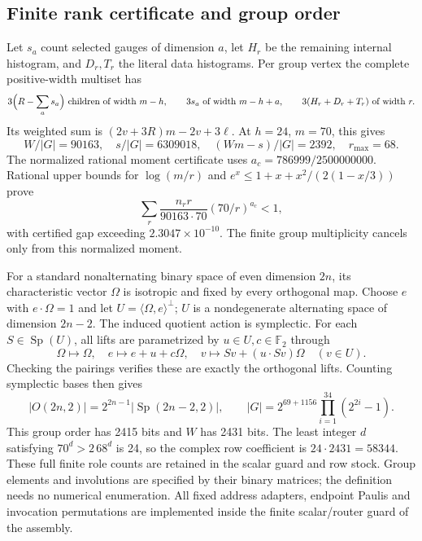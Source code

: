 \subsection{Finite rank certificate and group order}
Let $s_a$ count selected gauges of dimension $a$, let $H_r$ be the
remaining internal histogram, and $D_r,T_r$ the literal data histograms.
Per group vertex the complete positive-width multiset has
\[
 3\Bigl(R-\sum_a s_a\Bigr)\text{ children of width }m-h,\qquad
 3s_a\text{ of width }m-h+a,\qquad
 3(H_r+D_r+T_r)\text{ of width }r.
\]
Its weighted sum is $(2v+3R)m-2v+3\ell$.
At $h=24$, $m=70$, this gives
\[
 W/|G|=90163,\quad s/|G|=6309018,\quad
 (Wm-s)/|G|=2392,\quad r_{\max}=68.
\]
The normalized rational moment certificate uses
$a_c=786999/2500000000$. Rational upper bounds for
$\log(m/r)$ and
$e^x\le 1+x+x^2/(2(1-x/3))$ prove
\[
 \sum_r\frac{n_r r}{90163\cdot70}
        (70/r)^{a_c}<1,
\]
with certified gap exceeding $2.3047\times10^{-10}$.
The finite group multiplicity cancels only from this normalized moment.

For a standard nonalternating binary space of even dimension $2n$,
its characteristic vector $\Omega$ is isotropic and fixed by every
orthogonal map. Choose $e$ with $e\cdot\Omega=1$ and let
$U=\langle\Omega,e\rangle^\perp$; $U$ is a nondegenerate alternating
space of dimension $2n-2$. The induced quotient action is symplectic.
For each $S\in\operatorname{Sp}(U)$, all lifts are parametrized by
$u\in U,c\in\mathbb F_2$ through
\[
 \Omega\mapsto\Omega,\quad e\mapsto e+u+c\Omega,\quad
 v\mapsto Sv+(u\cdot Sv)\Omega\quad(v\in U).
\]
Checking the pairings verifies these are exactly the orthogonal lifts.
Counting symplectic bases then gives
\[
 |O(2n,2)|=2^{2n-1}|\operatorname{Sp}(2n-2,2)|,\qquad
 |G|=2^{69+1156}\prod_{i=1}^{34}(2^{2i}-1).
\]
This group order has 2415 bits and $W$ has 2431 bits. The least integer
$d$ satisfying $70^d>2\,68^d$ is 24, so the complex row coefficient is
$24\cdot2431=58344$. These full finite role counts are retained in the
scalar guard and row stock. Group elements and involutions are specified
by their binary matrices; the definition needs no numerical enumeration.
All fixed address adapters, endpoint Paulis and invocation permutations
are implemented inside the finite scalar/router guard of the assembly.
